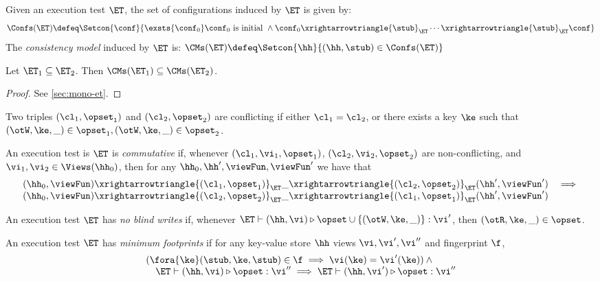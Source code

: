 \begin{definition}
\label{def:cm}
Given an execution test $\ET$, the set of configurations induced by $\ET$ is given by:
\[
\Confs(\ET) \defeq \Setcon{ \conf}{ \exsts{\conf_0} \conf_0 \text{ is initial } \wedge \conf_0 \xrightarrowtriangle{\stub}_{\ET} \cdots \xrightarrowtriangle{\stub}_{\ET} \conf }
\]
The \emph{consistency model} induced by $\ET$ is:
\( 
\CMs(\ET) \defeq \Setcon{ \hh }{ (\hh, \stub) \in \Confs(\ET) }
\)
\end{definition}



\begin{proposition}
\label{prop:mono-et}
Let $\ET_1 \subseteq \ET_2$. Then $\CMs(\ET_1) \subseteq \CMs(\ET_2)$.
\end{proposition}
\begin{proof}
    \ifTechReport
    
    \else
    See \cref{sec:mono-et}.
    \fi
\end{proof}

\begin{definition}
Two triples $(\cl_1, \opset_1)$ and $(\cl_2, \opset_2)$ are 
conflicting if either $\cl_1 = \cl_2$, or there exists a key $\ke$ such that 
$(\otW, \ke, \_) \in \opset_1, (\otW, \ke, \_) \in \opset_2$. 

An execution test is $\ET$ is \emph{commutative} if, whenever $(\cl_1, \vi_1, \opset_1)$, 
$(\cl_2, \vi_2, \opset_2)$ are non-conflicting, and $\vi_1, \vi_2 \in \Views(\hh_0)$,  
then for any $\hh_0, \hh', \viewFun, \viewFun'$ we have that 
\[
\begin{array}{lr}
(\hh_0, \viewFun) \xrightarrowtriangle{(\cl_1, \opset_1)}_{\ET} 
\_ \xrightarrowtriangle{(\cl_2, \opset_2)}_{\ET} (\hh', \viewFun') &\implies \\
(\hh_0, \viewFun) \xrightarrowtriangle{(\cl_2, \opset_2)}_{\ET} 
\_ \xrightarrowtriangle{(\cl_1, \opset_1)}_{\ET} (\hh', \viewFun')
\end{array}
\]
\end{definition}

\begin{definition}
An execution test $\ET$ has \emph{no blind writes} if, whenever $\ET \vdash (\hh, \vi) \triangleright \opset \cup \{(\otW, \ke, \_)\} : \vi'$, 
then $(\otR, \ke, \_) \in \opset$.
\end{definition}

\begin{definition}
An execution test $\ET$ has \emph{minimum footprints} if for any key-value store \( \hh \)
views \( \vi, \vi',\vi''\) and fingerprint \( \f \),
\[
\begin{array}{@{}l@{}}
    ( \fora{ \ke} (\stub, \ke, \stub) \in \f \implies \vi(\ke) = \vi'(\ke) ) \land {} \\
    \quad \ET \vdash (\hh, \vi) \triangleright \opset : \vi'' \implies \ET \vdash (\hh, \vi') \triangleright \opset : \vi''
\end{array}
\]
\end{definition}

